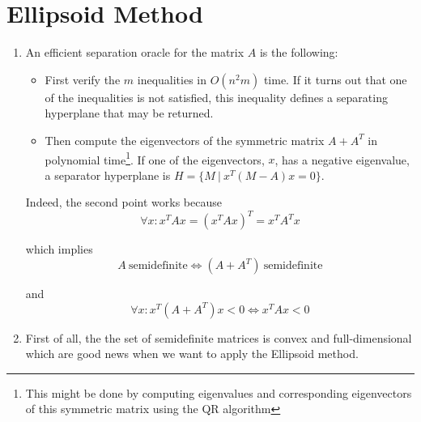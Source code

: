 \documentclass{scrartcl}
\begin{document}
\section{Ellipsoid Method}
\begin{enumerate}
\item
An efficient separation oracle for the matrix $A$ is the following:
\begin{itemize}
\item First verify the $m$ inequalities in $O(n^2m)$ time. If it turns out that one of the inequalities is not satisfied, this inequality defines a separating hyperplane that may be returned.

\item Then compute the eigenvectors of the symmetric matrix $A + A^T$ in polynomial time\footnote{This might be done by computing eigenvalues and corresponding eigenvectors of this symmetric matrix using the QR algorithm}. If one of the eigenvectors, $x$, has a negative eigenvalue, a separator hyperplane is $H = \{M\ |\ x^T (M-A) x = 0\}$.
\end{itemize}

Indeed, the second point works because
\[
\forall x\colon  x^T A x = (x^T A x)^T = x^T A^T x
\]

which implies
\[
A \ \text{semidefinite} \iff (A + A^T)\ \text{semidefinite}
\]

and
\[
\forall x\colon x^T (A + A^T) x < 0 \iff x^T A x < 0
\]

\item
First of all, the the set of semidefinite matrices is convex and full-dimensional which are good news when we want to apply the Ellipsoid method.


\end{enumerate}
\end{document}
